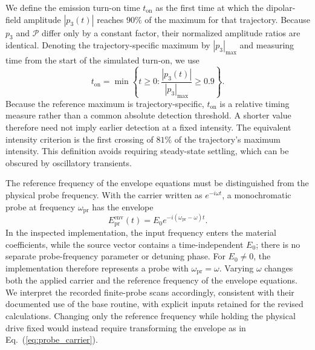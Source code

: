 \documentclass{optica-article}
\begin{document}
We define the emission turn-on time $t_{\mathrm{on}}$ as the first time at which the dipolar-field amplitude $|p_3(t)|$ reaches $90\%$ of the maximum for that trajectory. Because $p_3$ and $\mathcal P$ differ only by a constant factor, their normalized amplitude ratios are identical. Denoting the trajectory-specific maximum by $|p_3|_{\max}$ and measuring time from the start of the simulated turn-on, we use
\begin{equation}
t_{\mathrm{on}}=\min\left\{t\geq 0:\frac{|p_3(t)|}{|p_3|_{\max}}\geq 0.9\right\}.
\label{eq:turn_on_time}
\end{equation}
Because the reference maximum is trajectory-specific, $t_{\mathrm{on}}$ is a relative timing measure rather than a common absolute detection threshold. A shorter value therefore need not imply earlier detection at a fixed intensity. The equivalent intensity criterion is the first crossing of $81\%$ of the trajectory's maximum intensity. This definition avoids requiring steady-state settling, which can be obscured by oscillatory transients.

The reference frequency of the envelope equations must be distinguished from the physical probe frequency. With the carrier written as $e^{-i\omega t}$, a monochromatic probe at frequency $\omega_{\mathrm{pr}}$ has the envelope
\begin{equation}
E_{\mathrm{pr}}^{\mathrm{env}}(t)=E_0e^{-i(\omega_{\mathrm{pr}}-\omega)t}.
\label{eq:probe_carrier}
\end{equation}
In the inspected implementation, the input frequency enters the material coefficients, while the source vector contains a time-independent $E_0$; there is no separate probe-frequency parameter or detuning phase. For $E_0\neq0$, the implementation therefore represents a probe with $\omega_{\mathrm{pr}}=\omega$. Varying $\omega$ changes both the applied carrier and the reference frequency of the envelope equations. We interpret the recorded finite-probe scans accordingly, consistent with their documented use of the base routine, with explicit inputs retained for the revised calculations. Changing only the reference frequency while holding the physical drive fixed would instead require transforming the envelope as in Eq.~(\ref{eq:probe_carrier}).
\end{document}
